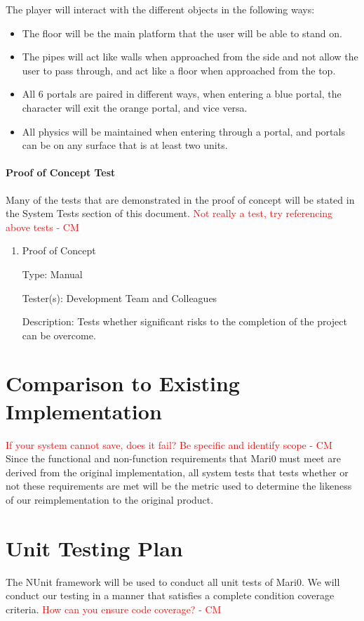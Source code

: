 \documentclass[12pt, titlepage]{article}
\begin{document}
The player will interact with the different objects in the following ways:
\begin{itemize}  
\item The floor will be the main platform that the user will be able to stand on.
\item The pipes will act like walls when approached from the side and not allow the user to pass through, and act like a floor when approached from the top.
\item All 6 portals are paired in different ways, when entering a blue portal, the character will exit the orange portal, and vice versa.
\item All physics will be maintained when entering through a portal, and portals can be on any surface that is at least two units.
\end{itemize}


\paragraph{Proof of Concept Test}

Many of the tests that are demonstrated in the proof of concept will be stated in the System Tests section of this document.
\textcolor{red}{Not really a test, try referencing above tests - CM} \\
\begin{enumerate}

\item{Proof of Concept}

Type: Manual

Tester(s): Development Team and Colleagues

Description: Tests whether significant risks to the completion of the project can be overcome.

\end{enumerate}
	
\section{Comparison to Existing Implementation}	
\textcolor{red}{If your system cannot save, does it fail? Be specific and identify scope - CM} \\
	Since the functional and non-function requirements that Mari0 must meet are derived from the original implementation, all system tests that tests whether or not these requirements are met will be the metric used to determine the likeness of our reimplementation to the original product.
\section{Unit Testing Plan}
	The NUnit framework will be used to conduct all unit tests of Mari0. We will conduct our testing in a manner that satisfies a complete condition coverage criteria.
	\textcolor{red}{How can you ensure code coverage? - CM} \\
\end{document}
